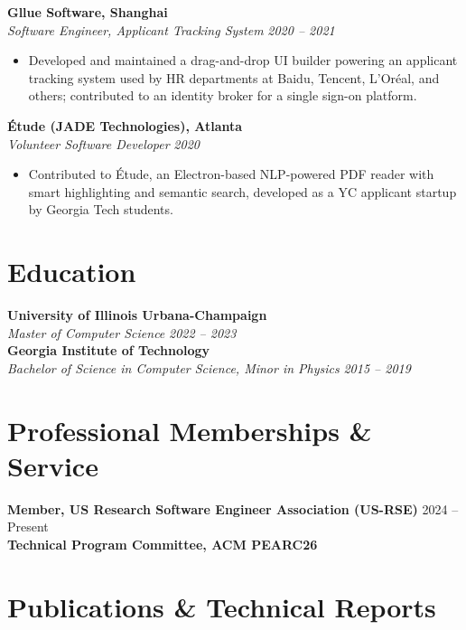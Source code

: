 \documentclass[11pt,letterpaper]{article}
\newcommand{\heading}[2]{%
  \textbf{#1} \hfill #2\\[2pt]
}
\newcommand{\subheading}[2]{%
  \textit{#1} \hfill \textit{#2}\\
}
\begin{document}
\vspace{12pt}
\heading{Gllue Software, Shanghai}{}
\subheading{Software Engineer, Applicant Tracking System}{2020 -- 2021}
\begin{itemize}[leftmargin=*, itemsep=2pt, topsep=0pt, partopsep=0pt]
  \item Developed and maintained a drag-and-drop UI builder powering an applicant tracking system used by HR departments at Baidu, Tencent, L'Or\'eal, and others; contributed to an identity broker for a single sign-on platform.
\end{itemize}

\vspace{12pt}
\heading{\'Etude (JADE Technologies), Atlanta}{}
\subheading{Volunteer Software Developer}{2020}
\begin{itemize}[leftmargin=*, itemsep=2pt, topsep=0pt, partopsep=0pt]
  \item Contributed to \'Etude, an Electron-based NLP-powered PDF reader with smart highlighting and semantic search, developed as a YC applicant startup by Georgia Tech students.
\end{itemize}

\section*{Education}

\heading{University of Illinois Urbana-Champaign}{}
\subheading{Master of Computer Science}{2022 -- 2023}

\medskip
\heading{Georgia Institute of Technology}{}
\subheading{Bachelor of Science in Computer Science, Minor in Physics}{2015 -- 2019}

\section*{Professional Memberships \& Service}

\heading{Member, US Research Software Engineer Association (US-RSE)}{2024 -- Present}

\medskip
\heading{Technical Program Committee, ACM PEARC26}{}

\section*{Publications \& Technical Reports}
\end{document}
